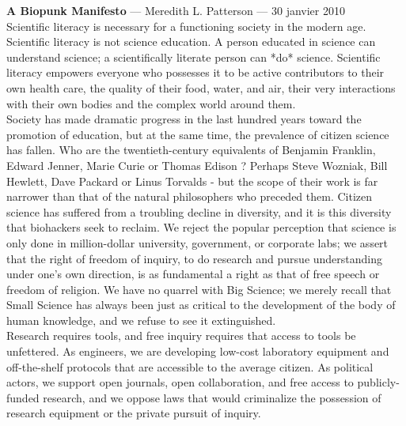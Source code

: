\documentclass[11pt,twoside,a4paper]{book}
\begin{document}
\begin{center} \begin{minipage}[ht]{0.95\textwidth}
	\small
	\textbf{\Large A Biopunk Manifesto} --- Meredith L. Patterson --- 30 janvier 2010 ~\\
	
	Scientific literacy is necessary for a functioning society in the modern age. Scientific literacy is not science education. A person educated in science can understand science; a scientifically literate person can *do* science. Scientific literacy empowers everyone who possesses it to be active contributors to their own health care, the quality of their food, water, and air, their very interactions with their own bodies and the complex world around them. ~\\
	
	Society has made dramatic progress in the last hundred years toward the promotion of education, but at the same time, the prevalence of citizen science has fallen. Who are the twentieth-century equivalents of Benjamin Franklin, Edward Jenner, Marie Curie or Thomas Edison ? Perhaps Steve Wozniak, Bill Hewlett, Dave Packard or Linus Torvalds - but the scope of their work is far narrower than that of the natural philosophers who preceded them. Citizen science has suffered from a troubling decline in diversity, and it is this diversity that biohackers seek to reclaim. We reject the popular perception that science is only done in million-dollar university, government, or corporate labs; we assert that the right of freedom of inquiry, to do research and pursue understanding under one's own direction, is as fundamental a right as that of free speech or freedom of religion. We have no quarrel with Big Science; we merely recall that Small Science has always been just as critical to the development of the body of human knowledge, and we refuse to see it extinguished. ~\\
	
	Research requires tools, and free inquiry requires that access to tools be unfettered. As engineers, we are developing low-cost laboratory equipment and off-the-shelf protocols that are accessible to the average citizen. As political actors, we support open journals, open collaboration, and free access to publicly-funded research, and we oppose laws that would criminalize the possession of research equipment or the private pursuit of inquiry. ~\\
	

\end{minipage}
\end{center}
\end{document}
